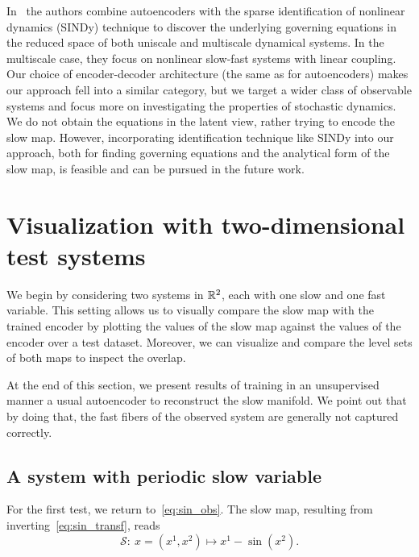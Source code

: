 \documentclass{article}
\newcommand{\smap}{\mathcal{S}} %
\begin{document}
In~\cite{champion_discovery_2019, champion_data-driven_2019} the authors combine autoencoders with the sparse identification of nonlinear dynamics (SINDy) technique to discover the underlying governing equations in the reduced space of both uniscale and multiscale dynamical systems. In the multiscale case, they focus on nonlinear slow-fast systems with linear coupling. Our choice of encoder-decoder architecture (the same as for autoencoders) makes our approach fell into a similar category, but we target a wider class of observable systems and focus more on investigating the properties of stochastic dynamics. We do not obtain the equations in the latent view, rather trying to encode the slow map. However, incorporating identification technique like SINDy into our approach, both for finding governing equations and the analytical form of the slow map, is feasible and can be pursued in the future work.

\section{Visualization with two-dimensional test systems}\label{sec:visu_2D}
We begin by considering two systems in $\mathbb{R}^2$, each with one slow and one fast variable. This setting allows us to visually compare the slow map with the trained encoder by plotting the values of the slow map against the values of the encoder over a test dataset. Moreover, we can visualize and compare the level sets of both maps to inspect the overlap.

At the end of this section, we present results of training in an unsupervised manner a usual autoencoder to reconstruct the slow manifold. We point out that by doing that, the fast fibers of the observed system are generally not captured correctly.

\subsection{A system with periodic slow variable}\label{sec:sin_analysis}
For the first test, we return to~\eqref{eq:sin_obs}. The slow map, resulting from inverting~\eqref{eq:sin_transf}, reads
\begin{equation}\label{eq:sin_slow}
    \smap:\ x=(x^1, x^2)\mapsto x^1 - \sin(x^2).
\end{equation}
\end{document}

